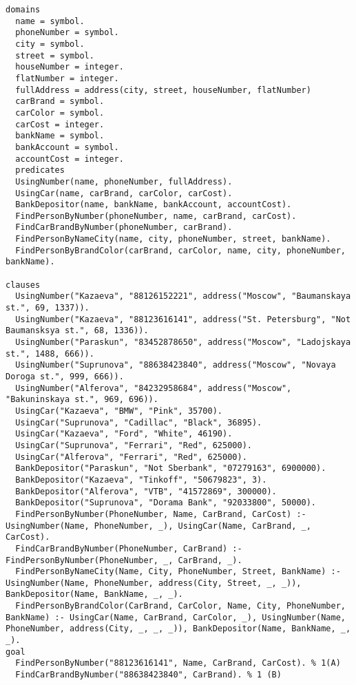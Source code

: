\begin{lstlisting}
domains
  name = symbol.
  phoneNumber = symbol.
  city = symbol.
  street = symbol.
  houseNumber = integer.
  flatNumber = integer.
  fullAddress = address(city, street, houseNumber, flatNumber)
  carBrand = symbol.
  carColor = symbol.
  carCost = integer.
  bankName = symbol.
  bankAccount = symbol.
  accountCost = integer.
  predicates
  UsingNumber(name, phoneNumber, fullAddress).
  UsingCar(name, carBrand, carColor, carCost).
  BankDepositor(name, bankName, bankAccount, accountCost).
  FindPersonByNumber(phoneNumber, name, carBrand, carCost).
  FindCarBrandByNumber(phoneNumber, carBrand).
  FindPersonByNameCity(name, city, phoneNumber, street, bankName).
  FindPersonByBrandColor(carBrand, carColor, name, city, phoneNumber, bankName).

clauses
  UsingNumber("Kazaeva", "88126152221", address("Moscow", "Baumanskaya st.", 69, 1337)).
  UsingNumber("Kazaeva", "88123616141", address("St. Petersburg", "Not Baumansksya st.", 68, 1336)).
  UsingNumber("Paraskun", "83452878650", address("Moscow", "Ladojskaya st.", 1488, 666)).
  UsingNumber("Suprunova", "88638423840", address("Moscow", "Novaya Doroga st.", 999, 666)).
  UsingNumber("Alferova", "84232958684", address("Moscow", "Bakuninskaya st.", 969, 696)).
  UsingCar("Kazaeva", "BMW", "Pink", 35700).
  UsingCar("Suprunova", "Cadillac", "Black", 36895).
  UsingCar("Kazaeva", "Ford", "White", 46190).
  UsingCar("Suprunova", "Ferrari", "Red", 625000).
  UsingCar("Alferova", "Ferrari", "Red", 625000).
  BankDepositor("Paraskun", "Not Sberbank", "07279163", 6900000).
  BankDepositor("Kazaeva", "Tinkoff", "50679823", 3).
  BankDepositor("Alferova", "VTB", "41572869", 300000).
  BankDepositor("Suprunova", "Dorama Bank", "92033800", 50000).
  FindPersonByNumber(PhoneNumber, Name, CarBrand, CarCost) :- UsingNumber(Name, PhoneNumber, _), UsingCar(Name, CarBrand, _, CarCost).
  FindCarBrandByNumber(PhoneNumber, CarBrand) :- FindPersonByNumber(PhoneNumber, _, CarBrand, _).
  FindPersonByNameCity(Name, City, PhoneNumber, Street, BankName) :- UsingNumber(Name, PhoneNumber, address(City, Street, _, _)), BankDepositor(Name, BankName, _, _).
  FindPersonByBrandColor(CarBrand, CarColor, Name, City, PhoneNumber, BankName) :- UsingCar(Name, CarBrand, CarColor, _), UsingNumber(Name, PhoneNumber, address(City, _, _, _)), BankDepositor(Name, BankName, _, _).
goal
  FindPersonByNumber("88123616141", Name, CarBrand, CarCost). % 1(A)
  FindCarBrandByNumber("88638423840", CarBrand). % 1 (B)
\end{lstlisting}

